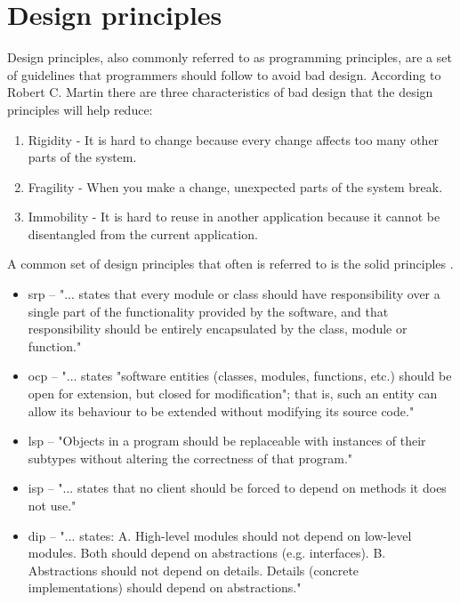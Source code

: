 \documentclass{report}
\begin{document}
\section{Design principles}
\label{design-principles}
Design principles, also commonly referred to as programming principles, are a set of guidelines that programmers should follow to avoid bad design. According to Robert C. Martin \cite{robertcmartinprinciples} there are three characteristics of bad design that the design principles will help reduce:

\begin{enumerate}
	\item Rigidity - It is hard to change because every change affects too many other parts of the system.
	\item Fragility - When you make a change, unexpected parts of the system break.
	\item Immobility - It is hard to reuse in another application because it cannot be disentangled from the current application.
\end{enumerate}
A common set of design principles that often is referred to is the \gls{solid} principles \cite{solid}.

\begin{itemize}
    \item \gls{srp} -- "... states that every module or class should have responsibility over a single part of the functionality provided by the software, and that responsibility should be entirely encapsulated by the class, module or function." \cite{srp}
    \item \gls{ocp} -- "... states "software entities (classes, modules, functions, etc.) should be open for extension, but closed for modification"; that is, such an entity can allow its behaviour to be extended without modifying its source code." \cite{ocp}
    \item \gls{lsp} -- "Objects in a program should be replaceable with instances of their subtypes without altering the correctness of that program." \cite{lsp}
    \item \gls{isp} -- "... states that no client should be forced to depend on methods it does not use." \cite{isp}
    \item \gls{dip} --  "... states: \newline A. High-level modules should not depend on low-level modules. Both should depend on abstractions (e.g. interfaces). \newline
B. Abstractions should not depend on details. Details (concrete implementations) should depend on abstractions." \cite{dip}
\end{itemize}
    
\end{document}
